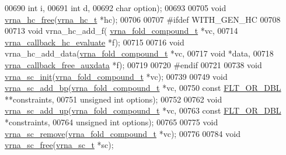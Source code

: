 \begin{DoxyCode}
00690                                 \textcolor{keywordtype}{int} i,
00691                                 \textcolor{keywordtype}{int} d,
00692                                 \textcolor{keywordtype}{char} option);
00693 
00705 \textcolor{keywordtype}{void} \hyperlink{group__hard__constraints_ga696dcf77887d856c6f21ea266d8b9ca2}{vrna\_hc\_free}(\hyperlink{group__hard__constraints_structvrna__hc__s}{vrna\_hc\_t} *hc);
00706 
00707 \textcolor{preprocessor}{#ifdef WITH\_GEN\_HC}
00708 
00713 \textcolor{keywordtype}{void} vrna\_hc\_add\_f( \hyperlink{group__fold__compound_structvrna__fc__s}{vrna\_fold\_compound\_t} *vc,
00714                     \hyperlink{group__hard__constraints_ga16eb71ac9a7a35369be2eaa9d8f8dfa0}{vrna\_callback\_hc\_evaluate} *f);
00715 
00716 \textcolor{keywordtype}{void} vrna\_hc\_add\_data(\hyperlink{group__fold__compound_structvrna__fc__s}{vrna\_fold\_compound\_t} *vc,
00717                       \textcolor{keywordtype}{void} *data,
00718                       \hyperlink{group__fold__compound_ga3ae51bfd5fc3236652d1de4e3274b49b}{vrna\_callback\_free\_auxdata} *f);
00719 
00720 \textcolor{preprocessor}{#endif}
00721 
00738 \textcolor{keywordtype}{void} \hyperlink{group__soft__constraints_ga9d977a1681356778cc66dceafbe5b032}{vrna\_sc\_init}(\hyperlink{group__fold__compound_structvrna__fc__s}{vrna\_fold\_compound\_t} *vc);
00739 
00749 \textcolor{keywordtype}{void} \hyperlink{group__soft__constraints_ga86049d4bb0ea8674cae9b6177156b184}{vrna\_sc\_add\_bp}(\hyperlink{group__fold__compound_structvrna__fc__s}{vrna\_fold\_compound\_t} *vc,
00750                     \textcolor{keyword}{const} \hyperlink{group__data__structures_ga31125aeace516926bf7f251f759b6126}{FLT\_OR\_DBL} **constraints,
00751                     \textcolor{keywordtype}{unsigned} \textcolor{keywordtype}{int} options);
00752 
00762 \textcolor{keywordtype}{void} \hyperlink{group__soft__constraints_ga30f30c8eff9676775a3e831d972b5284}{vrna\_sc\_add\_up}(\hyperlink{group__fold__compound_structvrna__fc__s}{vrna\_fold\_compound\_t} *vc,
00763                     \textcolor{keyword}{const} \hyperlink{group__data__structures_ga31125aeace516926bf7f251f759b6126}{FLT\_OR\_DBL} *constraints,
00764                     \textcolor{keywordtype}{unsigned} \textcolor{keywordtype}{int} options);
00765 
00775 \textcolor{keywordtype}{void} \hyperlink{group__soft__constraints_ga73cdc07b9a199c614367bebef0f2c41a}{vrna\_sc\_remove}(\hyperlink{group__fold__compound_structvrna__fc__s}{vrna\_fold\_compound\_t} *vc);
00776 
00784 \textcolor{keywordtype}{void} \hyperlink{group__soft__constraints_ga6d55446448d69346fc313b993c4fb3e8}{vrna\_sc\_free}(\hyperlink{group__soft__constraints_structvrna__sc__s}{vrna\_sc\_t} *sc);

\end{DoxyCode}
